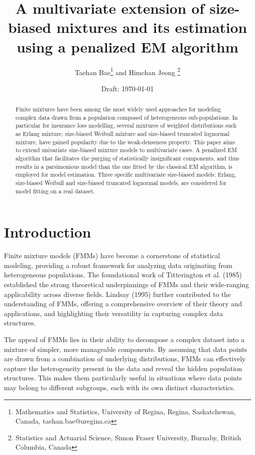 \documentclass[11pt]{article}
\date{Draft: \today}
\begin{document}
\vskip 2.0cm
\title{A multivariate extension of size-biased mixtures and its estimation using a penalized EM algorithm} \vskip 2.0cm
\author{Taehan Bae\footnote{Mathematics and Statistics, University of Regina, Regina,
Saskatchewan, Canada, taehan.bae@uregina.ca} and Himchan Jeong \footnote{Statistics and Actuarial Science, Simon Fraser University, Burnaby, British Columbia, Canada}}


\maketitle
\vskip 1.5cm

\begin{abstract}
Finite mixtures have been among the most widely used approaches for modeling complex data drawn from a population composed of heterogeneous sub-populations. In particular for insurance loss modelling, several mixtures of weighted distributions such as Erlang mixture, size-biased Weibull mixture and size-biased truncated lognormal mixture, have gained popularity due to the weak-denseness property.    
This paper aims to extend univariate size-biased mixture models to multivariate cases. A penalized EM algorithm that facilitates the purging of statistically insignificant components, and thus results in a parsimonious model than the one fitted by the classical EM algorithm, is employed for model estimation. Three specific multivariate size-biased models: Erlang, size-biased Weibull and size-biased truncated lognormal models, are considered for model fitting on a real dataset.      
\end{abstract}

\section{Introduction}
Finite mixture models (FMMs) have become a cornerstone of statistical modeling, providing a robust framework for analyzing data originating from heterogeneous populations. The foundational work of Titterington et al. (1985)\nocite{Titterington1985} established the strong theoretical underpinnings of FMMs and their wide-ranging applicability across diverse fields. Lindsay (1995) \nocite{Lindsay1995} further contributed to the understanding of FMMs, offering a comprehensive overview of their theory and applications, and highlighting their versatility in capturing complex data structures.

The appeal of FMMs lies in their ability to decompose a complex dataset into a mixture of simpler, more manageable components. By assuming that data points are drawn from a combination of underlying distributions, FMMs can effectively capture the heterogeneity present in the data and reveal the hidden population structures. This makes them particularly useful in situations where data points may belong to different subgroups, each with its own distinct characteristics.
\end{document}
